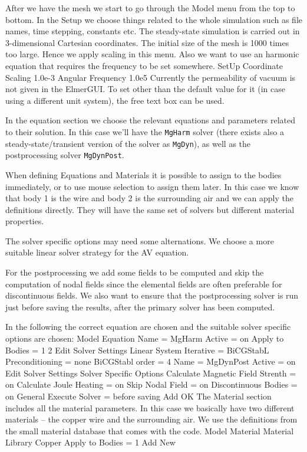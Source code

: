 After we have the mesh we start to go through the Model menu from the top to bottom. 
In the Setup we choose things related to the whole simulation such as file names, 
time stepping, constants etc.
The steady-state simulation is carried out in 3-dimensional Cartesian
coordinates. The initial size of the mesh is 1000 times too large. Hence we apply scaling in this menu.
Also we want to use an harmonic equation that requires the frequency to be set somewhere. 
\ttbegin
SetUp
  Coordinate Scaling 
    1.0e-3
  Angular Frequency
    1.0e5   
\ttend
Currently the permeability of vacuum is not given
in the ElmerGUI. To set other than the default value for it (in case using a different unit system),
the free text box can be used.

In the equation section we choose the relevant equations and parameters related to their solution. 
In this case we'll have the \texttt{MgHarm} solver (there exists also a steady-state/transient version of the solver
as \texttt{MgDyn}), as well as the postprocessing solver \texttt{MgDynPost}.

When defining Equations and Materials it is possible to assign to the bodies immediately, or to use mouse
selection to assign them later. In this case we know that body 1 is the wire and body 2 is the surrounding air and we
can apply the definitions directly.
They will have the same set of solvers but different material properties. 

The solver specific options may need some alternations. We choose a more suitable
linear solver strategy for the AV equation. 

For the postprocessing we add some fields to be computed and skip the computation of nodal fields since the
elemental fields are often preferable for discontinuous fields. 
We also want to ensure that the postprocessing solver is run just before saving the results, after the primary solver has been computed.

In the following the correct equation are chosen and the suitable solver specific options are chosen:
\ttbegin
Model
  Equation
    Name = MgHarm
      Active = on
      Apply to Bodies = 1 2  
      Edit Solver Settings
        Linear System
          Iterative = BiCGStabL
        Preconditioning = none
        BiCGStabl order = 4    
    Name = MgDynPost
      Active = on
      Edit Solver Settings
        Solver Specific Options
          Calculate Magnetic Field Strenth = on
          Calculate Joule Heating = on
          Skip Nodal Field = on
          Discontinuous Bodies = on
        General
          Execute Solver = before saving   
    Add 
    OK
\ttend        
The Material section includes all the material parameters. In this case we basically have two 
different materials -- the copper wire and the surrounding air.
We use the definitions from the small material database that comes with the code.
\ttbegin
Model
  Material
    Material Library
      Copper
    Apply to Bodies = 1
    Add
    New

